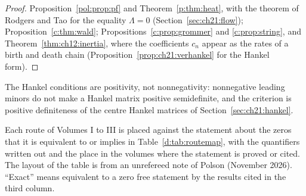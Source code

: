 \begin{proof}
Proposition~\ref{pol:prop:pf} and Theorem~\ref{p:thm:heat}, with the theorem of Rodgers and Tao \cite{RodgersTao} for the equality $\Lambda=0$ (Section~\ref{sec:ch21:flow}); Proposition~\ref{c:thm:wald}; Propositions~\ref{c:prop:grommer} and \ref{c:prop:string}, and Theorem~\ref{thm:ch12:inertia}, where the coefficients $c_n$ appear as the rates of a birth and death chain (Proposition~\ref{prop:ch21:verhankel} for the Hankel form).
\end{proof}

The Hankel conditions are positivity, not nonnegativity: nonnegative leading minors do not make a Hankel matrix positive semidefinite, and the criterion is positive definiteness of the centre Hankel matrices of Section~\ref{sec:ch21:hankel}.

Each route of Volumes I to III is placed against the statement about the zeros that it is equivalent to or implies in Table~\ref{d:tab:routemap}, with the quantifiers written out and the place in the volumes where the statement is proved or cited. The layout of the table is from an unrefereed note of Polson (November 2026). ``Exact'' means equivalent to a zero free statement by the results cited in the third column.

